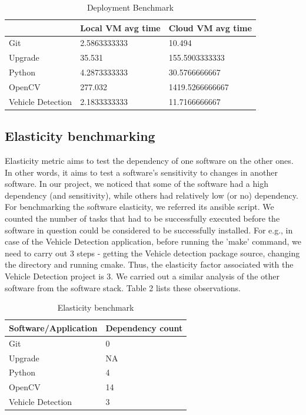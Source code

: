 \documentclass[9pt,twocolumn,twoside]{../../styles/osajnl}
\begin{document}
\begin{table}[]
\centering
\caption{Deployment Benchmark}
\label{Table 1}
\begin{tabular}{|l|l|l|}
\hline
 & Local VM avg time & Cloud VM avg time \\ \hline
Git & 2.5863333333 & 10.494 \\ \hline
Upgrade & 35.531 & 155.5903333333 \\ \hline
Python & 4.2873333333 & 30.5766666667 \\ \hline
OpenCV & 277.032 & 1419.5266666667 \\ \hline
Vehicle Detection & 2.1833333333 & 11.7166666667 \\ \hline
\end{tabular}
\end{table}

\subsection{Elasticity benchmarking}
Elasticity metric aims to test the dependency of one software on the
other ones.  In other words, it aims to test a software's sensitivity
to changes in another software.  In our project, we noticed that some
of the software had a high dependency (and sensitivity), while others
had relatively low (or no) dependency.  For benchmarking the software
elasticity, we referred its ansible script.  We counted the number of
tasks that had to be successfully executed before the software in
question could be considered to be successfully installed.  For e.g.,
in case of the Vehicle Detection application, before running the
'make' command, we need to carry out 3 steps - getting the Vehicle
detection package source, changing the directory and running cmake.
Thus, the elasticity factor associated with the Vehicle Detection
project is 3.  We carried out a similar analysis of the other
software from the software stack.  Table 2 lists these observations.

\begin{table}[]
\centering
\caption{Elasticity benchmark}
\label{Table 2}
\begin{tabular}{|l|l|}
\hline
Software/Application & Dependency count \\ \hline
Git & 0 \\ \hline
Upgrade & NA \\ \hline
Python & 4 \\ \hline
OpenCV & 14 \\ \hline
Vehicle Detection & 3 \\ \hline
\end{tabular}
\end{table}
\end{document}
